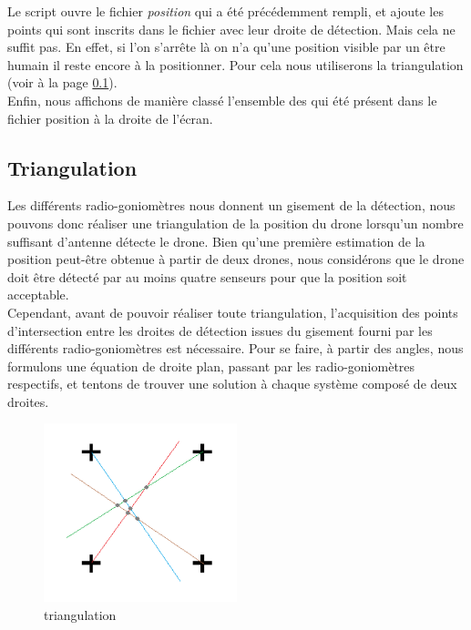 Le script ouvre le fichier \textit{position} qui a été précédemment rempli, et ajoute les points qui sont inscrits dans le fichier avec leur droite de détection. Mais cela ne suffit pas. En effet, si l'on s'arrête là on n'a qu'une position visible par un être humain il reste encore à la positionner. Pour cela nous utiliserons la triangulation (voir à la page \ref{sec:trian}).
~\\

Enfin, nous affichons de manière classé l'ensemble des \rpi qui été présent dans le fichier position à la droite de l'écran.




\subsection{Triangulation}
\label{sec:trian}
Les différents radio-goniomètres nous donnent un gisement de la détection, nous pouvons donc
réaliser une triangulation de la position du drone lorsqu’un nombre suffisant d’antenne détecte le
drone. Bien qu’une première estimation de la position peut-être obtenue à partir de deux drones,
nous considérons que le drone doit être détecté par au moins quatre senseurs pour que la position
soit acceptable.
~\\

Cependant, avant de pouvoir réaliser toute triangulation, l’acquisition des points d’intersection entre
les droites de détection issues du gisement fourni par les différents radio-goniomètres est nécessaire.
Pour se faire, à partir des angles, nous formulons une équation de droite plan, passant par les
radio-goniomètres respectifs, et tentons de trouver une solution à chaque système composé de deux
droites.
~\\

\begin{figure}

  \includegraphics[width=0.5\textwidth]{triangulation1}
  \caption{triangulation}
\end{figure}


